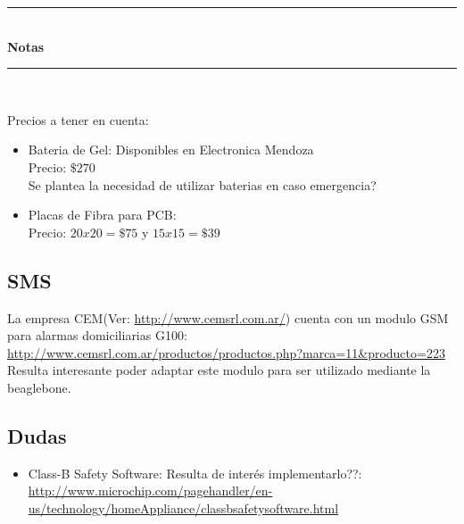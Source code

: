 \documentclass[idxtotoc,hyperref,openany]{labbook} %
\newcommand{\HRule}{\rule{\linewidth}{0.5mm}} %
\begin{document}
%

% 
% 
% 
% 
% 
% 
% 
% 
% 
% 


\labday{} %
\begin{center}
\HRule \\[0.4cm]
{\huge \textbf{Notas}}\\[0.4cm] %
\HRule \\[1.5cm]
\end{center}

Precios a tener en cuenta:
\begin{itemize}
 \item Bateria de Gel: Disponibles en Electronica Mendoza\\
 Precio: $\$270$\\
 Se plantea la necesidad de utilizar baterias en caso emergencia?
 \item Placas de Fibra para PCB:\\
 Precio: $20x20=\$75$ y $15x15=\$39$
\end{itemize}

\subsection{SMS}
La empresa CEM(Ver: \url{http://www.cemsrl.com.ar/}) cuenta con un modulo GSM para 
alarmas domiciliarias G100: \url{http://www.cemsrl.com.ar/productos/productos.php?marca=11&producto=223}\\
Resulta interesante poder adaptar este modulo para ser utilizado mediante la beaglebone.


\subsection{Dudas}
\begin{itemize}
 \item Class-B Safety Software: Resulta de interés implementarlo??: 
 \url{http://www.microchip.com/pagehandler/en-us/technology/homeAppliance/classbsafetysoftware.html}
\end{itemize}


\end{document}
